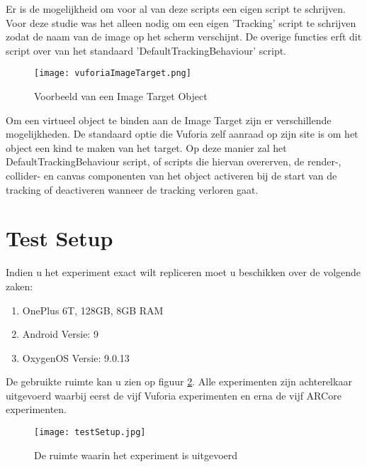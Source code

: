 Er is de mogelijkheid om voor al van deze scripts een eigen script te schrijven. Voor deze studie was het alleen nodig om een eigen 'Tracking' script te schrijven zodat de naam van de image op het scherm verschijnt. De overige functies erft dit script over van het standaard 'DefaultTrackingBehaviour' script.

\begin{figure}
    \texttt{[image: vuforiaImageTarget.png]}
    \caption{Voorbeeld van een Image Target Object}
    \label{fig:vuforiaImageTarget}
\end{figure}

Om een virtueel object te binden aan de Image Target zijn er verschillende mogelijkheden. De standaard optie die Vuforia zelf aanraad op zijn site is om het object een kind te maken van het target. Op deze manier zal het DefaultTrackingBehaviour script, of scripts die hiervan overerven, de render-, collider- en canvas componenten van het object activeren bij de start van de tracking of deactiveren wanneer de tracking verloren gaat.

\section{Test Setup}
Indien u het experiment exact wilt repliceren moet u beschikken over de volgende zaken:

\begin{enumerate}
    \item OnePlus 6T, 128GB, 8GB RAM
    \item Android Versie: 9
    \item OxygenOS Versie: 9.0.13
\end{enumerate}

De gebruikte ruimte kan u zien op figuur \ref{fig:testSetup}. Alle experimenten zijn achterelkaar uitgevoerd waarbij eerst de vijf Vuforia experimenten en erna de vijf ARCore experimenten.
\begin{figure}
    \texttt{[image: testSetup.jpg]}
    \caption{De ruimte waarin het experiment is uitgevoerd}
    \label{fig:testSetup}
\end{figure}
